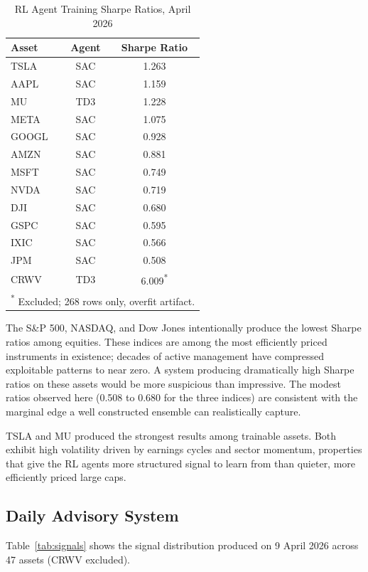 \documentclass[journal]{IEEEtran}
\begin{document}
\begin{table}[!t]
\renewcommand{\arraystretch}{1.3}
\caption{RL Agent Training Sharpe Ratios, April 2026}
\label{tab:sharpe_per_asset}
\centering
\begin{tabular}{|l|c|c|}
\hline
\textbf{Asset} & \textbf{Agent} & \textbf{Sharpe Ratio} \\
\hline
TSLA  & SAC & 1.263 \\
AAPL  & SAC & 1.159 \\
MU    & TD3 & 1.228 \\
META  & SAC & 1.075 \\
GOOGL & SAC & 0.928 \\
AMZN  & SAC & 0.881 \\
MSFT  & SAC & 0.749 \\
NVDA  & SAC & 0.719 \\
DJI   & SAC & 0.680 \\
GSPC  & SAC & 0.595 \\
IXIC  & SAC & 0.566 \\
JPM   & SAC & 0.508 \\
\hline
CRWV  & TD3 & 6.009\textsuperscript{*} \\
\hline
\multicolumn{3}{l}{\small \textsuperscript{*} Excluded; 268 rows only, overfit artifact.}
\end{tabular}
\end{table}

The S\&P 500, NASDAQ, and Dow Jones intentionally produce the lowest
Sharpe ratios among equities. These indices are among the most
efficiently priced instruments in existence; decades of active
management have compressed exploitable patterns to near zero. A system
producing dramatically high Sharpe ratios on these assets would be more
suspicious than impressive. The modest ratios observed here (0.508 to
0.680 for the three indices) are consistent with the marginal edge a
well constructed ensemble can realistically capture.

TSLA and MU produced the strongest results among trainable assets. Both
exhibit high volatility driven by earnings cycles and sector momentum,
properties that give the RL agents more structured signal to learn from
than quieter, more efficiently priced large caps.

\subsection{Daily Advisory System}

Table~\ref{tab:signals} shows the signal distribution produced on 9 April
2026 across 47 assets (CRWV excluded).
\end{document}
